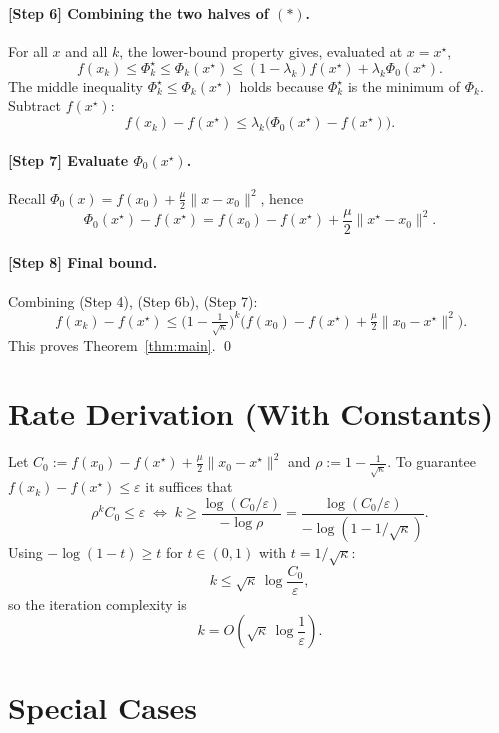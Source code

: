 \documentclass[11pt]{article}
\begin{document}
\paragraph{[Step 6] Combining the two halves of $(\ast)$.}
For all $x$ and all $k$, the lower-bound property gives, evaluated at $x=x^\star$,
\[
f(x_k) \le \Phi_k^\star \le \Phi_k(x^\star)
\le (1-\lambda_k) f(x^\star) + \lambda_k \Phi_0(x^\star). \tag{Step 6a}
\]
The middle inequality $\Phi_k^\star\le\Phi_k(x^\star)$ holds because $\Phi_k^\star$ is the minimum of $\Phi_k$.
Subtract $f(x^\star)$:
\[
f(x_k) - f(x^\star) \le \lambda_k\big(\Phi_0(x^\star) - f(x^\star)\big). \tag{Step 6b}
\]

\paragraph{[Step 7] Evaluate $\Phi_0(x^\star)$.}
Recall $\Phi_0(x) = f(x_0) + \frac{\mu}{2}\|x-x_0\|^2$, hence
\[
\Phi_0(x^\star) - f(x^\star) = f(x_0) - f(x^\star) + \frac{\mu}{2}\|x^\star - x_0\|^2. \tag{Step 7}
\]

\paragraph{[Step 8] Final bound.}
Combining (Step 4), (Step 6b), (Step 7):
\[
\boxed{\,f(x_k) - f(x^\star) \le \Big(1-\tfrac{1}{\sqrt{\kappa}}\Big)^{k}
\Big(f(x_0)-f(x^\star) + \tfrac{\mu}{2}\|x_0-x^\star\|^2\Big).}
\]
This proves Theorem~\ref{thm:main}. \qed

\section*{Rate Derivation (With Constants)}

Let $C_0 := f(x_0)-f(x^\star) + \frac{\mu}{2}\|x_0-x^\star\|^2$ and $\rho := 1-\frac{1}{\sqrt{\kappa}}$.
To guarantee $f(x_k)-f(x^\star)\le\varepsilon$ it suffices that
\[
\rho^k C_0 \le \varepsilon
\;\Longleftrightarrow\;
k \ge \frac{\log(C_0/\varepsilon)}{-\log\rho}
= \frac{\log(C_0/\varepsilon)}{-\log(1-1/\sqrt\kappa)}.
\]
Using $-\log(1-t)\ge t$ for $t\in(0,1)$ with $t=1/\sqrt\kappa$:
\[
k \le \sqrt{\kappa}\,\log\!\frac{C_0}{\varepsilon},
\]
so the iteration complexity is
\[
k = O\!\left(\sqrt{\kappa}\,\log\frac{1}{\varepsilon}\right).
\]

\section*{Special Cases}
\end{document}
